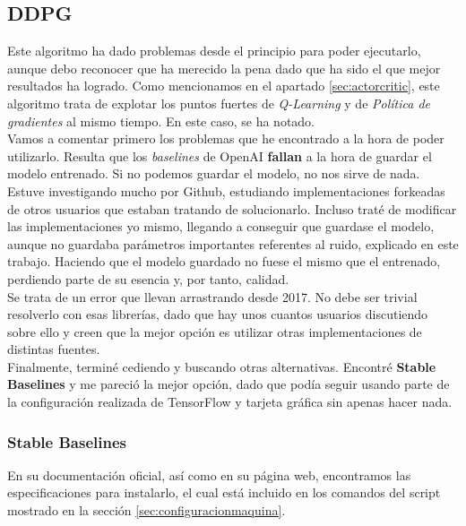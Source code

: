 \documentclass[11pt,fleqn]{book} %
\begin{document}
\subsection{DDPG}\label{sec:mountain:DDPG}

Este algoritmo ha dado problemas desde el principio para poder ejecutarlo, aunque debo reconocer que ha merecido la pena dado que ha sido el que mejor resultados ha logrado. Como mencionamos en el apartado \ref{sec:actorcritic}, este algoritmo trata de explotar los puntos fuertes de \textit{Q-Learning} y de \textit{Política de gradientes} al mismo tiempo. En este caso, se ha notado. \\

Vamos a comentar primero los problemas que he encontrado a la hora de poder utilizarlo. Resulta que los \textit{baselines} de OpenAI \textbf{fallan} a la hora de guardar el modelo entrenado. Si no podemos guardar el modelo, no nos sirve de nada. \\

Estuve investigando mucho por Github, estudiando implementaciones forkeadas de otros usuarios que estaban tratando de solucionarlo. Incluso traté de modificar las implementaciones yo mismo, llegando a conseguir que guardase el modelo, aunque no guardaba parámetros importantes referentes al ruido, explicado en este trabajo. Haciendo que el modelo guardado no fuese el mismo que el entrenado, perdiendo parte de su esencia y, por tanto, calidad.\cite{article:ddpgError1}\\

Se trata de un error que llevan arrastrando desde 2017. No debe ser trivial resolverlo con esas librerías, dado que hay unos cuantos usuarios discutiendo sobre ello y creen que la mejor opción es utilizar otras implementaciones de distintas fuentes. \\

Finalmente, terminé cediendo y buscando otras alternativas. Encontré \textbf{Stable Baselines} y me pareció la mejor opción, dado que podía seguir usando parte de la configuración realizada de TensorFlow y tarjeta gráfica sin apenas hacer nada.

\subsubsection{Stable Baselines}\label{sec:stablebaselines}

En su documentación oficial\cite{book:stablebaselines}, así como en su página web\cite{article:stablebaselines}, encontramos las especificaciones para instalarlo, el cual está incluido en los comandos del script mostrado en la sección \ref{sec:configuracionmaquina}. \\
\end{document}
